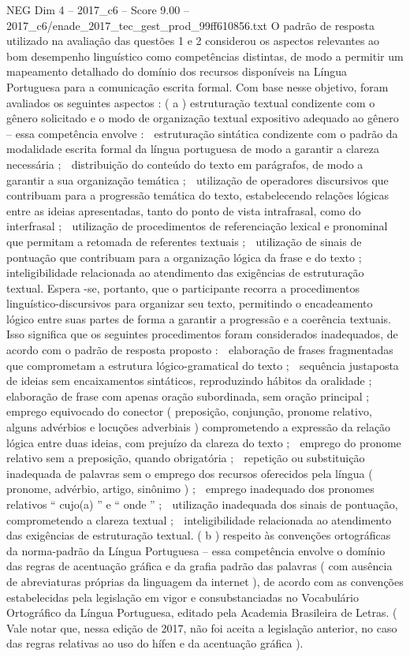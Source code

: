 \begin{textsample}{NEG Dim 4 – 2017\_c6 – Score 9.00 – 2017\_c6/enade\_2017\_tec\_gest\_prod\_99ff610856.txt}
O padrão de resposta utilizado na avaliação das questões 1 e 2 considerou os aspectos relevantes ao bom desempenho linguístico como competências distintas, de modo a permitir um mapeamento detalhado do domínio dos recursos disponíveis na Língua Portuguesa para a comunicação escrita formal.
Com base nesse objetivo, foram avaliados os seguintes aspectos : ( a ) estruturação textual condizente com o gênero solicitado e o modo de organização textual expositivo adequado ao gênero – essa competência envolve :  estruturação sintática condizente com o padrão da modalidade escrita formal da língua portuguesa de modo a garantir a clareza necessária ;  distribuição do conteúdo do texto em parágrafos, de modo a garantir a sua organização temática ;  utilização de operadores discursivos que contribuam para a progressão temática do texto, estabelecendo relações lógicas entre as ideias apresentadas, tanto do ponto de vista intrafrasal, como do interfrasal ;  utilização de procedimentos de referenciação lexical e pronominal que permitam a retomada de referentes textuais ;  utilização de sinais de pontuação que contribuam para a organização lógica da frase e do texto ;  inteligibilidade relacionada ao atendimento das exigências de estruturação textual.
Espera -se, portanto, que o participante recorra a procedimentos linguístico-discursivos para organizar seu texto, permitindo o encadeamento lógico entre suas partes de forma a garantir a progressão e a coerência textuais.
Isso significa que os seguintes procedimentos foram considerados inadequados, de acordo com o padrão de resposta proposto :  elaboração de frases fragmentadas que comprometam a estrutura lógico-gramatical do texto ;  sequência justaposta de ideias sem encaixamentos sintáticos, reproduzindo hábitos da oralidade ;  elaboração de frase com apenas oração subordinada, sem oração principal ;  emprego equivocado do conector ( preposição, conjunção, pronome relativo, alguns advérbios e locuções adverbiais ) comprometendo a expressão da relação lógica entre duas ideias, com prejuízo da clareza do texto ;  emprego do pronome relativo sem a preposição, quando obrigatória ;  repetição ou substituição inadequada de palavras sem o emprego dos recursos oferecidos pela língua ( pronome, advérbio, artigo, sinônimo ) ;  emprego inadequado dos pronomes relativos “ cujo(a) ” e “ onde ” ;  utilização inadequada dos sinais de pontuação, comprometendo a clareza textual ;  inteligibilidade relacionada ao atendimento das exigências de estruturação textual. ( b ) respeito às convenções ortográficas da norma-padrão da Língua Portuguesa – essa competência envolve o domínio das regras de acentuação gráfica e da grafia padrão das palavras ( com ausência de abreviaturas próprias da linguagem da internet ), de acordo com as convenções estabelecidas pela legislação em vigor e consubstanciadas no Vocabulário Ortográfico da Língua Portuguesa, editado pela Academia Brasileira de Letras. ( Vale notar que, nessa edição de 2017, não foi aceita a legislação anterior, no caso das regras relativas ao uso do hífen e da acentuação gráfica ).

\end{textsample}
